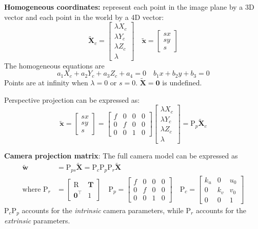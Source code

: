 \documentclass[12pt]{article}
\begin{document}
\textbf{Homogeneous coordinates:} represent each point in the image plane by a 3D vector and each point in the world by a 4D vector:
$$
\tilde{\mathbf{X}}_c = \begin{bmatrix}
    \lambda X_c \\
    \lambda Y_c \\
    \lambda Z_c \\
    \lambda
\end{bmatrix}
\quad
\tilde{\mathbf{x}} = \begin{bmatrix}
    s x \\
    s y \\
    s
\end{bmatrix}
$$
The homogeneous equations are
$$
a_1 X_c + a_2 Y_c + a_3 Z_c + a_4 = 0
\quad
b_1 x + b_2 y + b_3 = 0
$$
Points are at infinity when $\lambda = 0$ or $s = 0$. $\tilde{\mathbf{X}} = \mathbf{0}$ is undefined.

Perspective projection can be expressed as:
$$
\tilde{\mathbf{x}}= \begin{bmatrix}
    s x \\
    s y \\
    s
\end{bmatrix} = 
\begin{bmatrix}
    f & 0 & 0 & 0 \\
    0 & f & 0 & 0 \\
    0 & 0 & 1 & 0
\end{bmatrix}
\begin{bmatrix}
    \lambda X_c \\
    \lambda Y_c \\
    \lambda Z_c \\
    \lambda
\end{bmatrix} = \mathrm{P}_p \tilde{\mathbf{X}}_c
$$

\textbf{Camera projection matrix}: The full camera model can be expressed as
\begin{align*}
\mathbf{\tilde{w}} &= \mathrm{P}_{ps} \tilde{\mathbf{X}} = \mathrm{P}_c \mathrm{P}_p \mathrm{P}_r \tilde{\mathbf{X}} \\
\text{where } \mathrm{P}_r &= \begin{bmatrix}
    \mathrm{R} & \mathbf{T} \\
    \mathbf{0}^\top & 1
\end{bmatrix} \quad
\mathrm{P}_p = \begin{bmatrix}
    f & 0 & 0 & 0 \\
    0 & f & 0 & 0 \\
    0 & 0 & 1 & 0
\end{bmatrix}
\quad
\mathrm{P}_c = \begin{bmatrix}
    k_u & 0 & u_0 \\
    0 & k_v & v_0 \\
    0 & 0 & 1
\end{bmatrix}
\end{align*}
$\mathrm{P}_c \mathrm{P}_p$ accounts for the \textit{intrinsic} camera parameters, while $\mathrm{P}_r$ accounts for the \textit{extrinsic} parameters.
\end{document}
